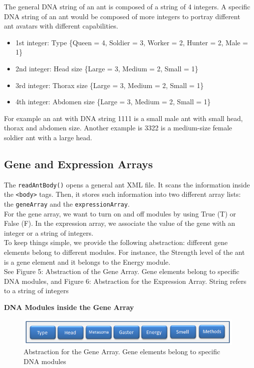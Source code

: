\documentclass[titlepage, 12pt]{article}
\begin{document}
The general DNA string of an ant is composed of a string of 4 integers. A specific DNA string of an ant would be composed of more integers to portray different ant avatars with different capabilities. 

\begin{itemize}
\item 1st integer: Type \{Queen  = 4, Soldier = 3, Worker = 2, Hunter = 2, Male = 1\}
\item 2nd integer: Head size \{Large  = 3, Medium = 2, Small = 1\}
\item 3rd integer: Thorax size \{Large  = 3, Medium = 2, Small = 1\}
\item 4th integer: Abdomen size \{Large  = 3, Medium = 2, Small = 1\}
\end{itemize}

For example an ant with DNA string 1111 is a small male ant with small head, thorax and abdomen size. Another example is 3322 is a medium-size female soldier ant with a large head. 

\subsection{Gene and Expression Arrays}

The {\tt readAntBody()} opens a general ant XML file.  It scans the information inside the {\tt <body>} tags. Then, it stores such information into two different array lists: the {\tt geneArray} and the {\tt expressionArray}.\\

For the gene array, we want to turn on and off modules by using True (T) or False (F). In the expression array, we associate the value of the gene with an integer or a string of integers. \\

To keep things simple, we provide the following abstraction: different gene elements belong to different modules. For instance, the Strength level of the ant is a gene element and it belongs to the Energy module.   \\

See Figure 5: Abstraction of the Gene Array. Gene elements belong to specific DNA modules, and Figure 6: Abstraction for the Expression Array. String refers to a string of integers

\newpage

\begin{center}
{\bf DNA Modules inside the Gene Array}
\end{center}
 \vspace{-5 mm}
\begin{figure}[h!]
    \centering
    \includegraphics{genearray.png}
    \caption{Abstraction for the Gene Array. Gene elements belong to specific DNA modules}
\end{figure}
\end{document}
